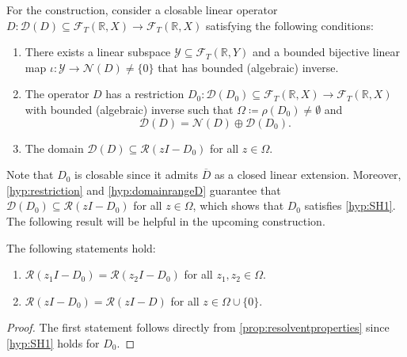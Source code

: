 \documentclass[english]{myarticle}
\begin{document}
\begin{sloppypar}
For the construction, consider a closable linear operator $D : \mathcal{D}(D) \subseteq \mathcal{F}_T(\mathbb{R},X) \to \mathcal{F}_T(\mathbb{R},X)$ satisfying the following conditions:
\begin{enumerate}[label=({H}{{\arabic*}})]
\setcounter{enumi}{0}
    \item \label{hyp:iota} There exists a linear subspace $\mathcal{Y} \subseteq \mathcal{F}_T(\mathbb{R}, Y)$ and a bounded bijective linear map $\iota: \mathcal{Y} \to \mathcal{N}(D) \neq \{0\}$ that has bounded (algebraic) inverse.
    \item \label{hyp:restriction} The operator $D$ has a restriction $D_0 : \mathcal{D}(D_0) \subseteq \mathcal{F}_T(\mathbb{R},X) \to \mathcal{F}_T(\mathbb{R},X)$ with bounded (algebraic) inverse such that $\Omega \coloneqq \rho(D_0) \neq \emptyset$ and 
    \begin{equation} \label{eq:D0_D}
    \mathcal{D}(D) = \mathcal{N} (D) \oplus \mathcal{D}(D_0).
    \end{equation}
    \item \label{hyp:domainrangeD} The domain $\mathcal{D}(D) \subseteq \mathcal{R}(zI-D_0)$ for all $z \in \Omega$.
\end{enumerate}
Note that $D_0$ is closable since it admits $\overline{D}$ as a closed linear extension. Moreover, \ref{hyp:restriction} and \ref{hyp:domainrangeD} guarantee that $\mathcal{D}(D_0) \subseteq \mathcal{R}(zI-D_0)$ for all $z \in \Omega$, which shows that $D_0$ satisfies \ref{hyp:SH1}. The following result will be helpful in the upcoming construction.
\begin{lemma}  \label{lemma:rangeinclusion}
    The following statements hold:
    \begin{enumerate}
        \item $\mathcal{R}(z_1 I-D_0) = \mathcal{R}(z_2 I - D_0)$ for all $z_1,z_2 \in \Omega$.
        \item $\mathcal{R}(zI-D_0) = \mathcal{R}(zI - D)$ for all $z \in \Omega \cup \{0\}$.
    \end{enumerate}
\end{lemma}
\begin{proof}
The first statement follows directly from \cref{prop:resolventproperties} since \ref{hyp:SH1} holds for $D_0$.


\end{proof}
\end{sloppypar}
\end{document}
